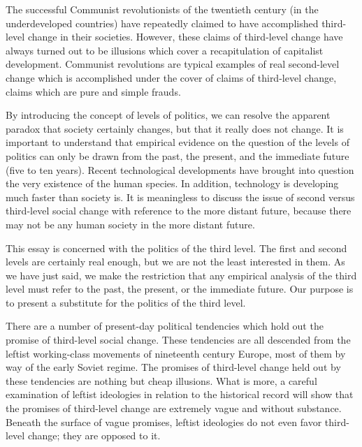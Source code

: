The successful Communist revolutionists of the twentieth century (in 
the underdeveloped countries) have repeatedly claimed to have accomplished 
third-level change in their societies. However, these claims of third-level 
change have always turned out to be illusions which cover a recapitulation of 
capitalist development. Communist revolutions are typical examples of real 
second-level change which is accomplished under the cover of claims of 
third-level change, claims which are pure and simple frauds. 

By introducing the concept of levels of politics, we can resolve the 
apparent paradox that society certainly changes, but that it really does not 
change. It is important to understand that empirical evidence on the 
question of the levels of politics can only be drawn from the past, the 
present, and the immediate future (five to ten years). Recent technological 
developments have brought into question the very existence of the human 
species. In addition, technology is developing much faster than society is. It 
is meaningless to discuss the issue of second versus third-level social change 
with reference to the more distant future, because there may not be any 
human society in the more distant future. 

This essay is concerned with the politics of the third level. The first and 
second levels are certainly real enough, but we are not the least interested in 
them. As we have just said, we make the restriction that any empirical 
analysis of the third level must refer to the past, the present, or the 
immediate future. Our purpose is to present a substitute for the politics of 
the third level. 

There are a number of present-day political tendencies which hold out 
the promise of third-level social change. These tendencies are all descended 
from the leftist working-class movements of nineteenth century Europe, 
most of them by way of the early Soviet regime. The promises of third-level 
change held out by these tendencies are nothing but cheap illusions. What is 
more, a careful examination of leftist ideologies in relation to the historical 
record will show that the promises of third-level change are extremely vague 
and without substance. Beneath the surface of vague promises, leftist 
ideologies do not even favor third-level change; they are opposed to it. 

